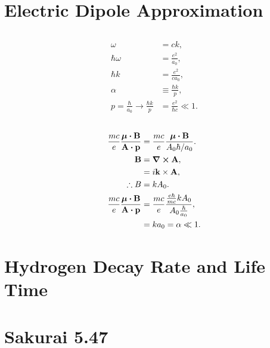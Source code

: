 \documentclass[
a4paper,
10pt,
twoside,
]{article}
\begin{document}
{}
\maketitle
\startmcols

\section{Electric Dipole Approximation}\label{sec: I}


\subsection{}\label{ssec: IA}

\begin{align}
	\omega &= ck,\\
	\hbar \omega &= \frac{e^2}{a_0},\\
	\hbar k &= \frac{e^2}{c a_0},\\
	\alpha &\equiv \frac{\hbar k}{p},\\
	p = \frac{\hbar}{a_0} \rightarrow  \frac{\hbar k}{p} &= \frac{e^2}{\hbar c} \ll 1.
\end{align}

\subsection{}\label{ssec: IB}

\begin{align}
	\frac{mc}{e}\frac{\bm{\mu} \vdot \vb{B}}{\vb{A} \vdot \vb{p}}
	&= \frac{mc}{e} \frac{\bm{\mu} \vdot \vb{B}}{A_0 \hbar/a_0}.\\
	\vb{B}
	&= \curl{\vb{A}},\\
	&= i \vb{k} \times \vb{A},\\
	\therefore B
	&= k A_0.\\
	\frac{mc}{e}\frac{\bm{\mu} \vdot \vb{B}}{\vb{A} \vdot \vb{p}}
	&= \frac{mc}{e} \frac{\frac{e\hbar}{mc} kA_0}{A_0 \frac{\hbar}{a_0}},\\
	&= ka_0 = \alpha \ll 1.
\end{align}

\section{Hydrogen Decay Rate and Life Time}\label{sec: II}


\section{Sakurai 5.47}\label{sec: III}
\end{document}
